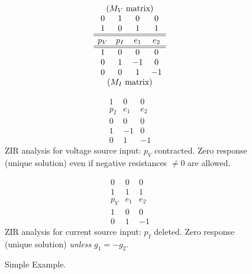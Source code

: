 \documentclass{article}
\begin{document}
\begin{figure}[htb]

\begin{minipage}[c]{.48\linewidth}
  \centering
 \centerline{}
\end{minipage}
%
\hfill
\begin{minipage}[c]{.48\linewidth}
\[
\begin{array}{cccc}
\multicolumn{4}{c}{\mbox{($M_V$ matrix)}} \\
0   &  1  &  0  &  0  \\
1   &  0  &  1  &  1  \\ \hline \hline
p_V & p_I & e_1 & e_2 \\ \hline \hline
1   &  0  &  0  &  0  \\
0   &  1  & -1  &  0  \\
0   &  0  &  1  &  -1 \\
\multicolumn{4}{c}{\mbox{($M_I$ matrix)}} \\
\end{array}
\]
\end{minipage}
%
\begin{minipage}[b]{.48\linewidth}
\[
\begin{array}{ccc}
  1  &  0  &  0  \\ \hline
 p_I & e_1 & e_2 \\ \hline
  0  &  0  &  0  \\
  1  & -1  &  0  \\
  0  &  1  &  -1
\end{array}
\]
ZIR analysis for voltage source input:
$p_V$ contracted.  Zero response (unique solution) even if
negative resistances $\neq 0$ are allowed.
\end{minipage}
\hfill
\begin{minipage}[b]{.48\linewidth}
\[
\begin{array}{ccc}
0   &  0  &  0  \\
1   &  1  &  1  \\ \hline
p_V & e_1 & e_2 \\ \hline
1   &  0  &  0  \\
0   &  1  &  -1
\end{array}
\]
ZIR analysis for current source input:
$p_I$ deleted.
Zero response (unique solution) \textit{unless}
$g_1 = -g_2$.  
\end{minipage}
\caption{Simple Example.}
\label{Simple}
%
\end{figure}
\end{document}
